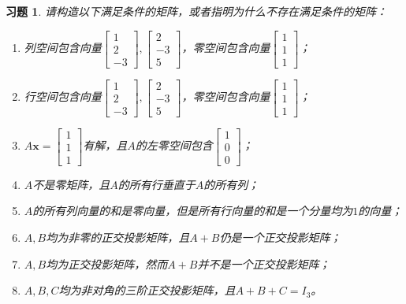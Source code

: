 \documentclass[UTF8]{ctexart}
\newtheorem{ex}[thm]{习题}
\begin{document}
\begin{ex}
请构造以下满足条件的矩阵，或者指明为什么不存在满足条件的矩阵：
\begin{enumerate}
\item 列空间包含向量$\begin{bmatrix}1\\2\\-3\end{bmatrix},\begin{bmatrix}2\\-3\\5\end{bmatrix}$，零空间包含向量$\begin{bmatrix}1\\1\\1\end{bmatrix}$；
\item 行空间包含向量$\begin{bmatrix}1\\2\\-3\end{bmatrix},\begin{bmatrix}2\\-3\\5\end{bmatrix}$，零空间包含向量$\begin{bmatrix}1\\1\\1\end{bmatrix}$；
\item $A\bm x=\begin{bmatrix}1\\1\\1\end{bmatrix}$有解，且$A$的左零空间包含$\begin{bmatrix}1\\0\\0\end{bmatrix}$；
\item $A$不是零矩阵，且$A$的所有行垂直于$A$的所有列；
\item $A$的所有列向量的和是零向量，但是所有行向量的和是一个分量均为$1$的向量；
\item $A,B$均为非零的正交投影矩阵，且$A+B$仍是一个正交投影矩阵；
\item $A,B$均为正交投影矩阵，然而$A+B$并不是一个正交投影矩阵；
\item $A,B,C$均为非对角的三阶正交投影矩阵，且$A+B+C=I_3$。
\end{enumerate}
\end{ex}
\end{document}
